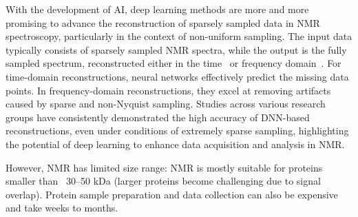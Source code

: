With the development of AI, deep learning methods are more and more promising to advance the reconstruction of sparsely sampled data in NMR spectroscopy, particularly in the context of non-uniform sampling. The input data typically consists of sparsely sampled NMR spectra, while the output is the fully sampled spectrum, reconstructed either in the time~\citep{hansen2019using,karunanithy2021fid} or frequency domain~\citep{qu2020accelerated,luo2020fast}. For time-domain reconstructions, neural networks effectively predict the missing data points. In frequency-domain reconstructions, they excel at removing artifacts caused by sparse and non-Nyquist sampling. Studies across various research groups have consistently demonstrated the high accuracy of DNN-based reconstructions, even under conditions of extremely sparse sampling, highlighting the potential of deep learning to enhance data acquisition and analysis in NMR.

However, NMR has limited size range: NMR is mostly suitable for proteins smaller than ~30–50 kDa (larger proteins become challenging due to signal overlap). Protein sample preparation and data collection can also be expensive and take weeks to months.



